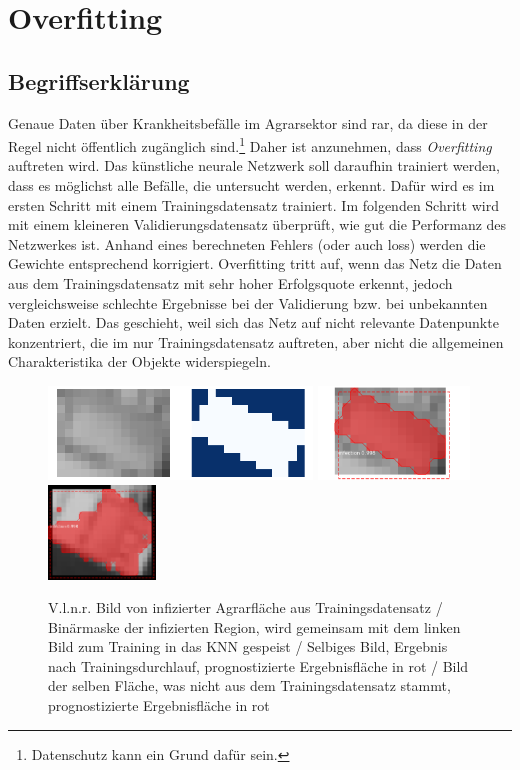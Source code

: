 \chapter{Overfitting}\label{chap:overfitting}

\section{Begriffserklärung}\label{sec:what-is-overfitting}

Genaue Daten über Krankheitsbefälle im Agrarsektor sind rar, da diese in der Regel nicht öffentlich zugänglich sind.\footnote{Datenschutz kann ein Grund dafür sein.}  Daher ist anzunehmen, dass \textit{Overfitting} auftreten wird. Das künstliche neurale Netzwerk soll daraufhin trainiert werden, dass es möglichst alle Befälle, die untersucht werden, erkennt. Dafür wird es im ersten Schritt mit einem Trainingsdatensatz trainiert. Im folgenden Schritt wird mit einem kleineren Validierungsdatensatz überprüft, wie gut die Performanz des Netzwerkes ist. Anhand eines berechneten Fehlers (oder auch loss) werden die Gewichte entsprechend korrigiert. Overfitting tritt auf, wenn das Netz die Daten aus dem Trainingsdatensatz mit sehr hoher Erfolgsquote erkennt, jedoch vergleichsweise schlechte Ergebnisse bei der Validierung bzw. bei unbekannten Daten erzielt. Das geschieht, weil sich das Netz auf nicht relevante Datenpunkte konzentriert, die im nur Trainingsdatensatz auftreten, aber nicht die allgemeinen Charakteristika der Objekte widerspiegeln. 
\\
\begin{figure}[ht]
  \centering
  \includegraphics[height=2.5cm]{pics/mask.png}
  \includegraphics[height=2.5cm]{pics/pred.png}
  \includegraphics[height=2.5cm]{pics/bad-pred.png}
  \caption[Beispiel Overfitting]{V.l.n.r. Bild von infizierter Agrarfläche aus Trainingsdatensatz / Binärmaske der infizierten Region, wird gemeinsam mit dem linken Bild zum Training in das KNN gespeist / Selbiges Bild, Ergebnis nach Trainingsdurchlauf, prognostizierte Ergebnisfläche in rot / Bild der selben Fläche, was nicht aus dem Trainingsdatensatz stammt, prognostizierte Ergebnisfläche in rot}
  \label{fig:example-overfitting}
\end{figure}


